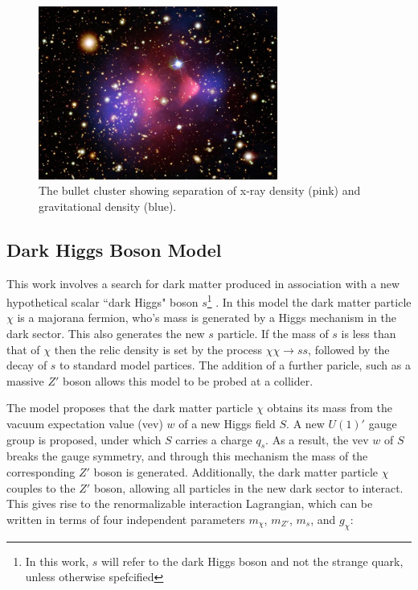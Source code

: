 \begin{figure}[H]
    \centering
    \includegraphics[width=0.7\textwidth]{Figures/1/bullet.png}
    \caption{The bullet cluster showing separation of x-ray density (pink) and gravitational density (blue).}
    \label{fig:bullet}
\end{figure}

\subsection{Dark Higgs Boson Model}
This work involves a search for dark matter produced in association with a new hypothetical scalar ``dark Higgs" boson $s$\footnote{In this work, $s$ will refer  to the dark Higgs boson and not the strange quark, unless otherwise spefcified} \cite{Hunting}. In this model the dark matter particle $\chi$ is a majorana fermion, who's mass is generated by a Higgs mechanism in the dark sector. This also generates the new $s$ particle. If the mass of $s$ is less than that of $\chi$ then the relic density is set by the process $\chi\chi \rightarrow ss$, followed by the decay of $s$ to standard model partices. The addition of a further paricle, such as a massive $Z'$ boson allows this model to be probed at a collider.

The model proposes that the dark matter particle $\chi$ obtains its mass from the vacuum expectation value (vev) $w$ of a new Higgs field $S$. A new $U(1)'$ gauge group is proposed, under which $S$ carries a charge $q_s$. As a result, the vev $w$ of $S$ breaks the gauge symmetry, and through this mechanism the mass of the corresponding $Z'$ boson is generated. Additionally, the dark matter particle $\chi$ couples to the $Z'$ boson, allowing all particles in the new dark sector to interact. This gives rise to the renormalizable interaction Lagrangian, which can be written in terms of four independent parameters $m_{\chi}$, $m_{Z'}$, $m_{s}$, and $g_{\chi}$:

